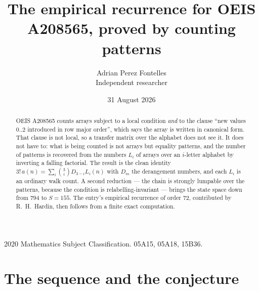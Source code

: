\documentclass[11pt,a4paper]{article}
\title{The empirical recurrence for OEIS A208565, proved by counting patterns}
\author{Adrian Perez Fontelles\\ \small Independent researcher}
\date{31 August 2026}
\theoremstyle{plain}
\theoremstyle{definition}
\begin{document}
\maketitle

\begin{abstract}
OEIS A208565 counts arrays subject to a local condition \emph{and} to the clause ``new values
$0..2$ introduced in row major order'', which says the array is written in canonical
form. That clause is not local, so a transfer matrix over the alphabet does not see it. It
does not have to: what is being counted is not arrays but equality patterns, and the number
of patterns is recovered from the numbers $L_i$ of arrays over an $i$-letter alphabet by
inverting a falling factorial. The result is the clean identity
$3!\,a(n)=\sum_i\binom{3}{i}D_{3-i}L_i(n)$ with $D_m$ the derangement numbers,
and each $L_i$ is an ordinary walk count. A second reduction --- the chain is strongly
lumpable over the patterns, because the condition is relabelling-invariant --- brings the
state space down from $794$ to $S=155$. The entry's empirical recurrence of order
$72$, contributed by R.~H.~Hardin, then follows from a finite exact computation.
\end{abstract}

\noindent\small 2020 Mathematics Subject Classification. 05A15, 05A18, 15B36.\normalsize

\section{The sequence and the conjecture}
\end{document}
